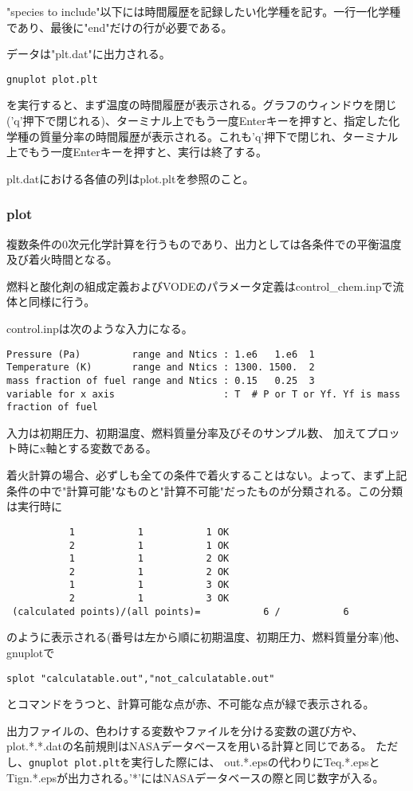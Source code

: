 \documentclass{jsarticle}
\begin{document}
"species to include"以下には時間履歴を記録したい化学種を記す。一行一化学種であり、最後に"end"だけの行が必要である。

データは"plt.dat"に出力される。
\begin{verbatim}
gnuplot plot.plt
\end{verbatim}
を実行すると、まず温度の時間履歴が表示される。グラフのウィンドウを閉じ('q'押下で閉じれる)、ターミナル上でもう一度Enterキーを押すと、指定した化学種の質量分率の時間履歴が表示される。これも'q'押下で閉じれ、ターミナル上でもう一度Enterキーを押すと、実行は終了する。

plt.datにおける各値の列はplot.pltを参照のこと。
\subsubsection{plot}%
複数条件の0次元化学計算を行うものであり、出力としては各条件での平衡温度及び着火時間となる。

燃料と酸化剤の組成定義およびVODEのパラメータ定義はcontrol\_chem.inpで流体と同様に行う。

control.inpは次のような入力になる。
\begin{verbatim}
Pressure (Pa)         range and Ntics : 1.e6   1.e6  1
Temperature (K)       range and Ntics : 1300. 1500.  2
mass fraction of fuel range and Ntics : 0.15   0.25  3
variable for x axis                   : T  # P or T or Yf. Yf is mass fraction of fuel
\end{verbatim}
入力は初期圧力、初期温度、燃料質量分率及びそのサンプル数、
加えてプロット時にx軸とする変数である。

着火計算の場合、必ずしも全ての条件で着火することはない。よって、まず上記条件の中で"計算可能"なものと"計算不可能"だったものが分類される。この分類は実行時に
\begin{verbatim}
           1           1           1 OK
           2           1           1 OK
           1           1           2 OK
           2           1           2 OK
           1           1           3 OK
           2           1           3 OK
 (calculated points)/(all points)=           6 /           6
\end{verbatim}
のように表示される(番号は左から順に初期温度、初期圧力、燃料質量分率)他、gnuplotで
\begin{verbatim}
splot "calculatable.out","not_calculatable.out"
\end{verbatim}
とコマンドをうつと、計算可能な点が赤、不可能な点が緑で表示される。

出力ファイルの、色わけする変数やファイルを分ける変数の選び方や、
plot.*.*.datの名前規則はNASAデータベースを用いる計算と同じである。
ただし、\verb|gnuplot plot.plt|を実行した際には、
out.*.epsの代わりにTeq.*.epsとTign.*.epsが出力される。'*'にはNASAデータベースの際と同じ数字が入る。
\end{document}
